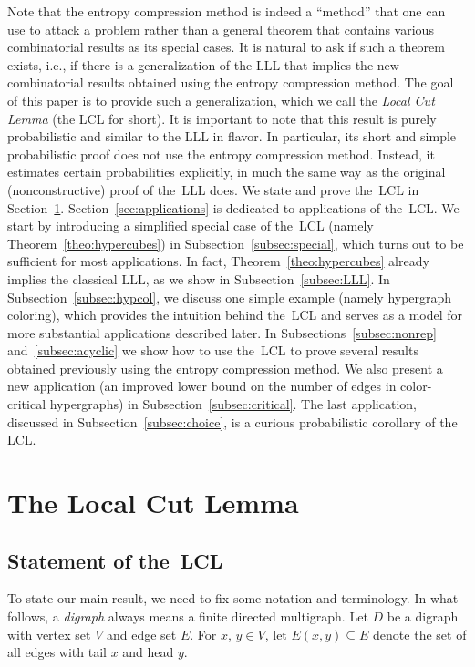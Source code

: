 \documentclass[10pt]{article}
\numberwithin{equation}{subsection}
\theoremstyle{definition}
\begin{document}
	Note that the entropy compression method is indeed a ``method'' that one can use to attack a problem rather than a general theorem that contains various combinatorial results as its special cases. It is natural to ask if such a theorem exists, i.e., if there is a generalization of the LLL that implies the new combinatorial results obtained using the entropy compression method. The goal of this paper is to provide such a generalization, which we call the \emph{Local Cut Lemma} (the LCL for short). It is important to note that this result is purely probabilistic and similar to the LLL in flavor. In particular, its short and simple probabilistic proof does not use the entropy compression method. Instead, it estimates certain probabilities explicitly, in much the same way as the original (nonconstructive) proof of the~LLL does. We state and prove the~LCL in Section~\ref{sec:statement}. Section~\ref{sec:applications} is dedicated to applications of the~LCL. We start by introducing a simplified special case of the~LCL (namely Theorem~\ref{theo:hypercubes}) in Subsection~\ref{subsec:special}, which turns out to be sufficient for most applications. In fact, Theorem~\ref{theo:hypercubes} already implies the classical LLL, as we show in Subsection~\ref{subsec:LLL}. In Subsection~\ref{subsec:hypcol}, we discuss one simple example (namely hypergraph coloring), which provides the intuition behind the~LCL and serves as a model for more substantial applications described later. In Subsections~\ref{subsec:nonrep} and~\ref{subsec:acyclic} we show how to use the~LCL to prove several results obtained previously using the entropy compression method. We also present a new application (an improved lower bound on the number of edges in color-critical hypergraphs) in Subsection~\ref{subsec:critical}. The last application, discussed in Subsection~\ref{subsec:choice}, is a curious probabilistic corollary of the LCL.
	
	\section{The Local Cut Lemma}\label{sec:statement}
	
	\subsection{Statement of the~LCL}
	
	To state our main result, we need to fix some notation and terminology. In what follows, a \emph{digraph} always means a finite %
	directed multigraph. Let $D$ be a digraph with vertex set $V$ and edge set $E$. For $x$, $y \in V$, let $E(x,y) \subseteq E$ denote the set of all edges with tail $x$ and head $y$.
	
\end{document}
